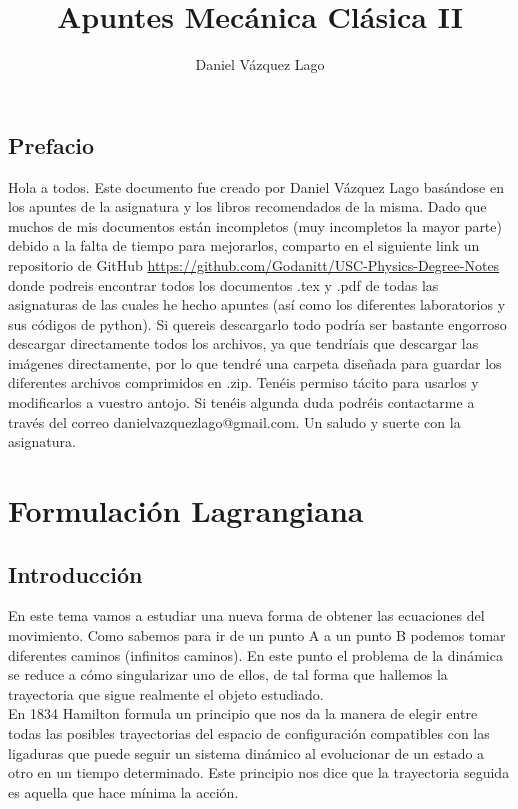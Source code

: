 \documentclass[12pt,a4paper]{book}
\author{Daniel Vázquez Lago}
\title{Apuntes Mecánica Clásica II}
\begin{document}
\maketitle

\newpage

\tableofcontents

\newpage
\section*{Prefacio}

Hola a todos. Este documento fue creado por Daniel Vázquez Lago basándose en los apuntes de la asignatura y los libros recomendados de la misma. Dado que muchos de mis documentos están incompletos (muy incompletos la mayor parte) debido a la falta de tiempo para mejorarlos, comparto en el siguiente link un repositorio de GitHub \url{https://github.com/Godanitt/USC-Physics-Degree-Notes} donde podreis encontrar todos los documentos .tex y .pdf de todas las asignaturas de las cuales he hecho apuntes (así como los diferentes laboratorios y sus códigos de python). Si quereis descargarlo todo podría ser bastante engorroso descargar directamente todos los archivos, ya que tendríais que descargar las imágenes directamente, por lo que tendré una carpeta diseñada para guardar los diferentes archivos comprimidos en .zip. Tenéis permiso tácito para usarlos y modificarlos a vuestro antojo. Si tenéis algunda duda podréis contactarme a través del correo danielvazquezlago@gmail.com. Un saludo y suerte con la asignatura.


\chapter{Formulación Lagrangiana}
\section{Introducción}

En este tema vamos a estudiar una nueva forma de obtener las ecuaciones del movimiento. Como sabemos para ir de un punto A a un punto B podemos tomar diferentes caminos (infinitos caminos). En este punto el problema de la dinámica se reduce a cómo singularizar uno de ellos, de tal forma que hallemos la trayectoria que sigue realmente el objeto estudiado. \\

En 1834 Hamilton formula un principio que nos da la manera de elegir entre todas las posibles trayectorias del espacio de configuración compatibles con las ligaduras que puede seguir un sistema dinámico al evolucionar de un estado a otro en un tiempo determinado. Este principio nos dice que la trayectoria seguida es aquella que hace mínima la acción. \\
\end{document}
